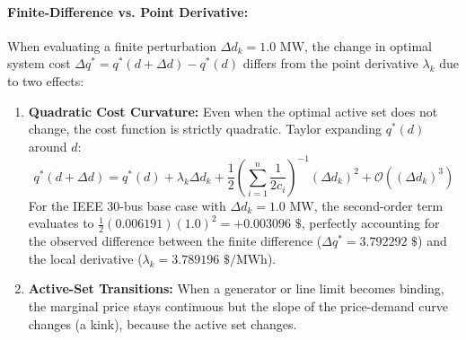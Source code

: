 \paragraph{Finite-Difference vs. Point Derivative:}
When evaluating a finite perturbation $\Delta d_k = 1.0\text{ MW}$, the change in optimal system cost $\Delta q^* = q^*(d + \Delta d) - q^*(d)$ differs from the point derivative $\lambda_k$ due to two effects:
\begin{enumerate}
    \item \textbf{Quadratic Cost Curvature:} Even when the optimal active set does not change, the cost function is strictly quadratic. Taylor expanding $q^*(d)$ around $d$:
    \begin{equation}
        q^*(d + \Delta d) = q^*(d) + \lambda_k \Delta d_k + \frac{1}{2} \left( \sum_{i=1}^n \frac{1}{2 c_i} \right)^{-1} (\Delta d_k)^2 + \mathcal{O}((\Delta d_k)^3)
    \end{equation}
    For the IEEE 30-bus base case with $\Delta d_k = 1.0\text{ MW}$, the second-order term evaluates to $\frac{1}{2} (0.006191)(1.0)^2 = +0.003096\text{ \$}$, perfectly accounting for the observed difference between the finite difference ($\Delta q^* = 3.792292\text{ \$}$) and the local derivative ($\lambda_k = 3.789196\text{ \$/MWh}$).
    \item \textbf{Active-Set Transitions:} When a generator or line limit becomes binding, the marginal price stays continuous but the slope of the price-demand curve changes (a kink), because the active set changes.
\end{enumerate}
